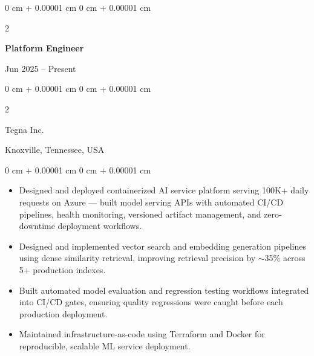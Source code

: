 \documentclass[10pt, letterpaper]{article}
\newenvironment{highlights}{
    \begin{itemize}[
        topsep=0.10 cm,
        parsep=0.10 cm,
        partopsep=0pt,
        itemsep=0pt,
        leftmargin=0 cm + 10pt
    ]
}{
    \end{itemize}
} %
\newenvironment{onecolentry}{
    \begin{adjustwidth}{
        0 cm + 0.00001 cm
    }{
        0 cm + 0.00001 cm
    }
}{
    \end{adjustwidth}
} %
\newenvironment{twocolentry}[2][]{
    \onecolentry
    \def\secondColumn{#2}
    \setcolumnwidth{\fill, 4.5 cm}
    \begin{paracol}{2}
}{
    \switchcolumn \raggedleft \secondColumn
    \end{paracol}
    \endonecolentry
} %
\begin{document}
    \begin{twocolentry}{Jun 2025 -- Present}
        \textbf{Platform Engineer}
    \end{twocolentry}
    \begin{twocolentry}{Knoxville, Tennessee, USA}
       Tegna Inc.
    \end{twocolentry}

    \begin{onecolentry}
        \begin{highlights}
            \item Designed and deployed containerized AI service platform serving 100K+ daily requests on Azure — built model serving APIs with automated CI/CD pipelines, health monitoring, versioned artifact management, and zero-downtime deployment workflows.
            \item Designed and implemented vector search and embedding generation pipelines using dense similarity retrieval, improving retrieval precision by $\sim$35\% across 5+ production indexes.
            \item Built automated model evaluation and regression testing workflows integrated into CI/CD gates, ensuring quality regressions were caught before each production deployment.
            \item Maintained infrastructure-as-code using Terraform and Docker for reproducible, scalable ML service deployment.
        \end{highlights}
    \end{onecolentry}

\vspace{1mm}
\end{document}
